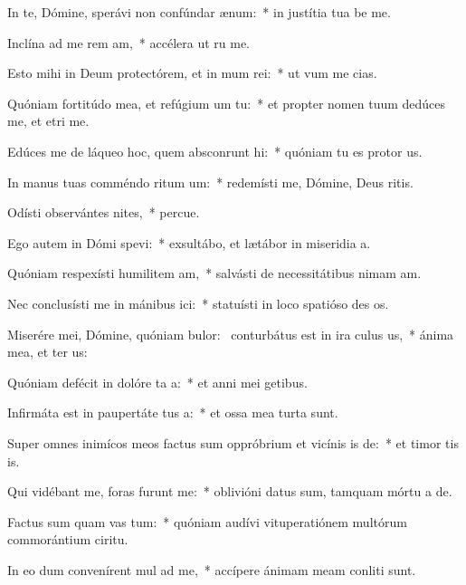\item In te, Dómine, sperávi non confúndar  ænum:~* in justítia tua be me.
\item Inclína ad me rem am,~* accélera ut ru me.
\item Esto mihi in Deum protectórem, et in mum rei:~* ut vum me cias.
\item Quóniam fortitúdo mea, et refúgium um  tu:~* et propter nomen tuum dedúces me, et etri me.
\item Edúces me de láqueo hoc, quem absconrunt hi:~* quóniam tu es protor us.
\item In manus tuas comméndo ritum um:~* redemísti me, Dómine, Deus ritis.
\item Odísti observántes nites,~* percue.
\item Ego autem in Dómi spevi:~* exsultábo, et lætábor in miseridia a.
\item Quóniam respexísti humilitem am,~* salvásti de necessitátibus nimam am.
\item Nec conclusísti me in mánibus ici:~* statuísti in loco spatióso des os.
\item Miserére mei, Dómine, quóniam bulor:~\pscross{} conturbátus est in ira culus us,~* ánima mea, et ter us:
\item Quóniam defécit in dolóre ta a:~* et anni mei  getibus.
\item Infirmáta est in paupertáte tus a:~* et ossa mea turta sunt.
\item Super omnes inimícos meos factus sum oppróbrium et vicínis is de:~* et timor tis is.
\item Qui vidébant me, foras furunt  me:~* oblivióni datus sum, tamquam mórtu a de.
\item Factus sum quam vas tum:~* quóniam audívi vituperatiónem multórum commorántium  ciritu.
\item In eo dum convenírent mul ad me,~* accípere ánimam meam conliti sunt.
